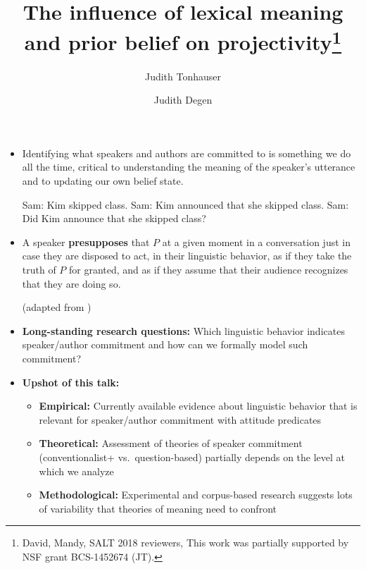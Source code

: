 \documentclass[11pt,fleqn]{article}
\title{The influence of lexical meaning and prior belief on projectivity\thanks{David, Mandy, SALT 2018 reviewers, This work was partially supported by NSF grant BCS-1452674 (JT).}}
\author[$\bullet$]{Judith Tonhauser}
\author[$\triangleright$]{Judith Degen}
\affil[$\bullet$]{The Ohio State University}
\affil[$\triangleright$]{Stanford University}
\newcommand{\6}{\mbox{$[\hspace*{-.6mm}[$}}
\newcommand{\9}{\mbox{$]\hspace*{-.6mm}]$}}
\begin{document}
\noindent
{}

\begin{itemize}[leftmargin=3ex,topsep=0pt,itemsep=-2pt]

\item Identifying what speakers and authors are committed to is something we do all the time, critical to understanding the meaning of the speaker's utterance and to updating our own belief state. 

\begin{exe}
\ex 
\begin{xlist}
\ex Sam: Kim skipped class.
\ex Sam: Kim announced that she skipped class.
\ex Sam: Did Kim announce that she skipped class?
\end{xlist}
\end{exe}

\item A speaker {\bf presupposes} that $P$ at a given moment in a conversation just in case they
are disposed to act, in their linguistic behavior, as if they take the truth of $P$ for granted, and as if they assume that their audience recognizes that they are doing so. \hfill \begin{footnotesize}(adapted from \citealt[448]{stalnaker73})\end{footnotesize}


\item {\bf Long-standing research questions:} Which linguistic behavior indicates speaker/author commitment and how can we formally model such commitment?

\item {\bf Upshot of this talk:} 

\begin{itemize}[leftmargin=3ex,topsep=0pt,itemsep=-2pt]

\item {\bf Empirical:} Currently available evidence about linguistic behavior that is relevant for speaker/author commitment with attitude predicates

\item {\bf Theoretical:} Assessment of theories of speaker commitment (conventionalist+ vs.\ question-based) partially depends on the level at which we analyze

\item {\bf Methodological:} Experimental and corpus-based research suggests lots of variability that theories of meaning need to confront


\end{itemize}
\end{itemize}
\end{document}
